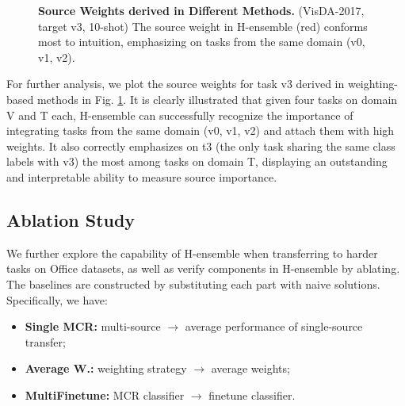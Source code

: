 \documentclass[letterpaper]{article} %
\begin{document}

\begin{figure}[ht]
    \centering
    \centerline{}
    \caption{\textbf{Source Weights derived in Different Methods.} (VisDA-2017, target v3, 10-shot) The source weight in H-ensemble (red) conforms most to intuition, emphasizing on tasks from the same domain (v0, v1, v2).}
    \label{fig:weight}
\end{figure}

For further analysis, we plot the source weights for task v3 derived in weighting-based methods in Fig. \ref{fig:weight}. It is clearly illustrated that given four tasks on domain V and T each, H-ensemble can successfully recognize the importance of integrating tasks from the same domain (v0, v1, v2) and attach them with high weights. It also correctly emphasizes on t3 (the only task sharing the same class labels with v3) the most among tasks on domain T, displaying an outstanding and interpretable ability to measure source importance.








\subsection{Ablation Study}

We further explore the capability of H-ensemble when transferring to harder tasks on Office datasets, as well as verify components in H-ensemble by ablating. The baselines are constructed by substituting each part with naive solutions. Specifically, we have:
\begin{itemize}
    \item \textbf{Single MCR:} multi-source $\to$ average performance of single-source transfer;
    \item \textbf{Average W.:} weighting strategy $\to$ average weights; \
    \item \textbf{MultiFinetune:} MCR classifier $\to$ finetune classifier.
\end{itemize}
\end{document}
